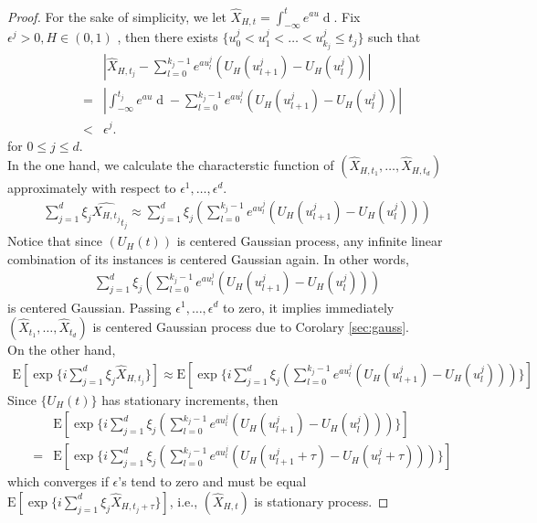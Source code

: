 \documentclass[a4paper, twoside, 11pt]{article}
\theoremstyle{definition}
\newcommand{\brkt}[1]{\left({#1} \right)}
\begin{document}
\begin{proof}
  For the sake of simplicity, we let $\hat{X}_{H,t} = \int_{-\infty}^t e^{au}\mathop{dU_H(u)}$.
  Fix $\epsilon^j > 0, H\in (0,1)$ , then there exists  $\{u_0^j<u_1^j<\dots<u^j_{k_j}\le t_j\}$ such that
  \begin{eqnarray*}
	&&|\hat{X}_{H,t_j} - \sum_{l=0}^{k_j-1} e^{au^j_l}(U_H(u^j_{l+1}) - U_H(u^j_{l}))|\\
	&=& |\int_{-\infty}^{t_j} e^{au}\mathop{dU_H(u)} - \sum_{l=0}^{k_j-1} e^{au^j_l}(U_H(u^j_{l+1}) - U_H(u^j_{l}))|\\
	&<& \epsilon^j.
  \end{eqnarray*}
  for $0 \le j \le d $.\\
  In the one hand, we calculate the characterstic function of $(\hat{X}_{H, t_1},\dots, \hat{X}_{H, t_d})$ approximately with respect to $\epsilon^1,\dots,\epsilon^d$.
  \begin{eqnarray*}
	\sum_{j=1}^d \xi_j\hat{X_{H,t_j}}_{t_j} \approx \sum_{j=1}^d \xi_j\brkt{\sum_{l=0}^{k_j-1} e^{au^j_l}(U_H(u^j_{l+1}) - U_H(u^j_{l}))}
  \end{eqnarray*}
  Notice that since $(U_H(t))$ is centered Gaussian process, any infinite linear combination of its instances is centered Gaussian again. In other words, 
  \begin{eqnarray*}
	\sum_{j=1}^d \xi_j \brkt{\sum_{l=0}^{k_j-1} e^{au^j_l}(U_H(u^j_{l+1}) - U_H(u^j_{l})) }
  \end{eqnarray*}
  is centered Gaussian. Passing $\epsilon^1,\dots,\epsilon^d$ to zero, it implies immediately $(\hat{X}_{t_1},\dots, \hat{X}_{t_d})$ is centered Gaussian process due to Corolary \ref{sec:gauss}.\\
  On the other hand,
	\begin{eqnarray*}
	\mathrm{E}[\exp\{i\sum_{j=1}^d \xi_j\hat{X}_{H, t_j}\}] \approx \mathrm{E}[\exp\{ i\sum_{j=1}^d \xi_j\brkt{\sum_{l=0}^{k_j-1} e^{au^j_l}(U_H(u^j_{l+1}) - U_H(u^j_{l})) }\}]
  \end{eqnarray*}
  Since $\{U_H(t)\}$ has stationary increments, then 
  \begin{eqnarray*}
	&& \mathrm{E}[\exp\{ i\sum_{j=1}^d \xi_j\brkt{\sum_{l=0}^{k_j-1} e^{au^j_l}(U_H(u^j_{l+1}) - U_H(u^j_{l})) }\}] \\
	&=& \mathrm{E}[\exp\{ i\sum_{j=1}^d \xi_j\brkt{\sum_{l=0}^{k_j-1} e^{au^j_l}(U_H(u^j_{l+1}+\tau) - U_H(u^j_{l}+\tau)) }\}]
  \end{eqnarray*}
  which converges if $\epsilon$'s tend to zero and must be equal $\mathrm{E}[\exp\{ i\sum_{j=1}^d \xi_j \hat{X}_{H, t_j+\tau}\}]$, i.e., $(\hat{X}_{H,t})$ is stationary process.
\end{proof}
\end{document}
